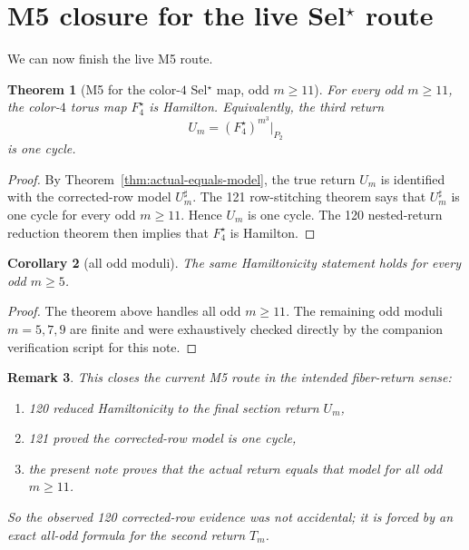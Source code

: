 \documentclass[11pt]{article}
\newtheorem{theorem}{Theorem}[section]
\newtheorem{corollary}[theorem]{Corollary}
\newtheorem{remark}[theorem]{Remark}
\newcommand{\1}{\mathbf 1}
\begin{document}
\section{M5 closure for the live Sel$^{\star}$ route}

We can now finish the live M5 route.

\begin{theorem}[M5 for the color-$4$ Sel$^{\star}$ map, odd $m\ge 11$]
For every odd $m\ge 11$, the color-$4$ torus map $F_4^{\star}$ is Hamilton.
Equivalently, the third return
\[
U_m=(F_4^{\star})^{m^3}\big|_{P_2}
\]
is one cycle.
\end{theorem}

\begin{proof}
By Theorem~\ref{thm:actual-equals-model}, the true return $U_m$ is identified
with the corrected-row model $U_m^{\sharp}$. The 121 row-stitching theorem says
that $U_m^{\sharp}$ is one cycle for every odd $m\ge 11$. Hence $U_m$ is one
cycle. The 120 nested-return reduction theorem then implies that $F_4^{\star}$
is Hamilton.
\end{proof}

\begin{corollary}[all odd moduli]
The same Hamiltonicity statement holds for every odd $m\ge 5$.
\end{corollary}

\begin{proof}
The theorem above handles all odd $m\ge 11$. The remaining odd moduli
$m=5,7,9$ are finite and were exhaustively checked directly by the companion
verification script for this note.
\end{proof}

\begin{remark}
This closes the current M5 route in the intended fiber-return sense:
\begin{enumerate}[label=\textup{(\roman*)},leftmargin=2em]
\item 120 reduced Hamiltonicity to the final section return $U_m$,
\item 121 proved the corrected-row model is one cycle,
\item the present note proves that the actual return equals that model for all
      odd $m\ge 11$.
\end{enumerate}
So the observed 120 corrected-row evidence was not accidental; it is forced by
an exact all-odd formula for the second return $T_m$.
\end{remark}
\end{document}
